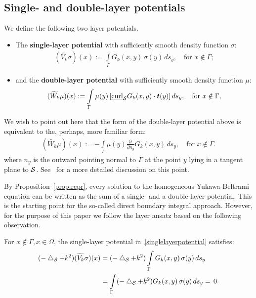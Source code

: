 \subsection{Single- and double-layer potentials}
We define the following two layer potentials.
\begin{itemize}
\item The {\bf single-layer potential} with sufficiently smooth density
function $\sigma$:
  \begin{align}
    (\widetilde{V_k}\sigma)(x):=\int\limits_{\Gamma}
    G_k(x,y)\,\sigma(y)\,ds_y,\quad\mbox{for $x \notin \Gamma$};
    \label{singlelayerpotential}
  \end{align}
\item and the {\bf double-layer potential} with sufficiently smooth
density function $\mu$:
  \begin{align}
    (\widetilde{W_k}\mu )(x):=\int\limits_{\Gamma}
    \mu(y)\,[\underline{\mbox{curl}}_{\S} G_k(x,y)\cdot \vec{t}(y)]\,
    ds_y, \quad\mbox{for $x\notin\Gamma$},
    \label{doublelayerpotential}
  \end{align}
\end{itemize}
We wish to point out here that the form of the double-layer potential above is equivalent to the, perhaps, more familiar form:
  \begin{align}
    (\widetilde{W_k}\mu )(x):=-\int\limits_{\Gamma}
    \mu(y) \frac{\partial \,}{\partial n_y} G_k(x,y) \,
    ds_y, \quad\mbox{for $x\notin\Gamma$}.
  \end{align}
where $n_{y}$ is the outward pointing normal to $\Gamma$ at the point
$y$ lying in a tangent plane to $\S$.  See~\cite{kro:nig2013} for a
more detailed discussion on this point.

By Proposition~\ref{prop:repr}, every solution to the homogeneous
Yukawa-Beltrami equation can be written as the sum of a single- and a
double-layer potential.  This  is the starting point for the so-called
direct boundary integral approach. However, for the purpose of this
paper we follow the layer ansatz based on the following observation.

For $x\notin\Gamma, x\in \Omega$, the single-layer potential
in~\eqref{singlelayerpotential} satisfies:
\begin{align*}
  (-\lap_{\S} + k^{2}) (\widetilde{V_k}\sigma)(x)& =
  (-\lap_{\S} + k^2) \int\limits_\Gamma G_k(x,y)\, \sigma(y)\,ds_{y} \\
  & = \int\limits_\Gamma (-\lap_{\S}+k^2) G_k(x,y)\, 
    \sigma(y)\,ds_{y}= \, 0.
\end{align*}

